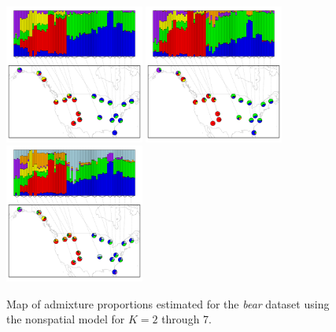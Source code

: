 \documentclass[12pt]{article}
\begin{document}
\begin{figure}
			{\includegraphics[width=1.8in,height=1.8in]{figs/bears/bear_nsp5.pdf}}
			{\includegraphics[width=1.8in,height=1.8in]{figs/bears/bear_nsp6.pdf}}
			{\includegraphics[width=1.8in,height=1.8in]{figs/bears/bear_nsp7.pdf}}
	\caption{
	Map of admixture proportions estimated for the \textit{bear} dataset 
	using the nonspatial model for $K=2$ through 7.
    }\label{bear_nsp_pies}
\end{figure}
\end{document}
